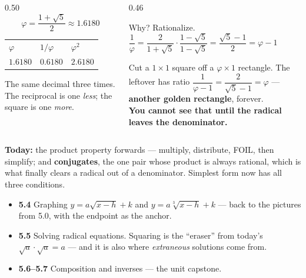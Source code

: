 \documentclass[aspectratio=169, 11pt]{beamer}
\begin{document}
\begin{frame}[t, plain]
  \begin{columns}[T]
    \begin{column}{0.50\textwidth}
      \[ \varphi=\frac{1+\sqrt5}{2}\approx 1.6180 \]
      \vspace{-10pt}
      \footnotesize
      \begin{tabular}{lll}
      \hline
      $\varphi$ & $1/\varphi$ & $\varphi^{2}$ \\
      $1.6180$ & $0.6180$ & $2.6180$ \\
      \hline
      \end{tabular}
      \vspace{6pt}

      {\footnotesize The same decimal three times. The reciprocal is one \emph{less}; the square is
      one \emph{more}.}
    \end{column}
    \begin{column}{0.46\textwidth}
      \begin{block}{Why? Rationalize.}
        $\dfrac{1}{\varphi}=\dfrac{2}{1+\sqrt5}\cdot\dfrac{1-\sqrt5}{1-\sqrt5}
        =\dfrac{\sqrt5-1}{2}=\varphi-1$
      \end{block}
      \vspace{4pt}
      {\footnotesize Cut a $1\times1$ square off a $\varphi\times1$ rectangle. The leftover has
      ratio $\dfrac{1}{\varphi-1}=\dfrac{2}{\sqrt5-1}=\varphi$ --- \textbf{another golden
      rectangle}, forever. \\[5pt]
      \textcolor{goldacc}{\textbf{You cannot see that until the radical leaves the denominator.}}}
    \end{column}
  \end{columns}
\end{frame}

\begin{frame}[t, plain]
  \textbf{Today:} the product property forwards --- multiply, distribute, FOIL, then simplify; and
  \textbf{conjugates}, the one pair whose product is always rational, which is what finally clears
  a radical out of a denominator. Simplest form now has all three conditions.\\[8pt]
  \begin{itemize}\setlength{\itemsep}{3pt}
    \item \textbf{5.4} Graphing $y=a\sqrt{x-h}+k$ and $y=a\sqrt[3]{x-h}+k$ --- back to the pictures
          from 5.0, with the endpoint as the anchor.
    \item \textbf{5.5} Solving radical equations. Squaring is the ``eraser'' from today's
          $\sqrt a\cdot\sqrt a=a$ --- and it is also where \emph{extraneous} solutions come from.
    \item \textbf{5.6--5.7} Composition and inverses --- the unit capstone.
  \end{itemize}
\end{frame}
\end{document}
